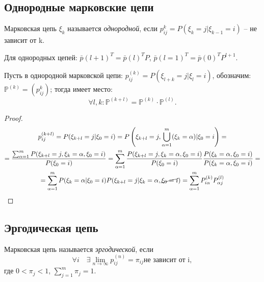 \subsection{Однородные марковские цепи}

\begin{definition}
  Марковская цепь $\xi_k$ называется \emph{однородной}, если $p_{ij}^k = P(\xi_k=j | \xi_{k-1}=i)$ -- не
  зависит от k.
\end{definition}

Для однородных цепей: $\bar{p}(l+1)^T = \bar{p}(l)^T P$, $\bar{p}(l=1)^T = \bar{p}(0)^T P^{l+1}$.

\begin{theorem}
  Пусть в однородной марковской цепи: $p_{ij}^{(k)} = P(\xi_{l+k} = j | \xi_l=i)$, обозначим:
  $\mathbb{P}^{(k)} = (p_{ij}^k)$; тогда имеет место:
  \[
    \forall l, k : \mathbb{P}^{(k+l)} = \mathbb{P}^{(k)} \cdot \mathbb{P}^{(l)}.
  \]
\end{theorem}
\begin{proof}
  \begin{multline*}
    p_{ij}^{(k+l)} = P(\xi_{k+l}=j | \xi_0 = i)
    = P\left(\xi_{k+l}=j, \bigcup_{\alpha=1}^m (\xi_k=\alpha) | \xi_0 = i\right) = \\
    = \dfrac{\sum_{\alpha=1}^m P(\xi_{k+l} = j, \xi_k = \alpha, \xi_0=i)}{P(\xi_0=i)}
    = \sum_{\alpha=1}^m \dfrac{P(\xi_{k+l} = j, \xi_k = \alpha, \xi_0=i)}{P(\xi_0=i)} \dfrac{P(\xi_k=\alpha, \xi_0=i)}{P(\xi_k=\alpha, \xi_0=i)} = \\
    = \sum_{\alpha=1}^m P(\xi_k=\alpha|\xi_0=i) P(\xi_{k+l}=j | \xi_k = \alpha, \cancel{\xi_0=i})
    = \sum_{\alpha=1}^m P_{i\alpha}^{(k)} P_{\alpha j}^{(l)}
  \end{multline*}
\end{proof}

\subsection{Эргодическая цепь}

\begin{definition}
  Марковская цепь называется \emph{эргодической}, если
  \[
    \forall i \quad \exists \lim_{n\to\infty} p_{ij}^{(n)} = \pi_{ij} \text{не зависит от i},
  \]
  где $0 < \pi_j < 1$, $\sum_{j=1}^m \pi_j = 1$.
\end{definition}

